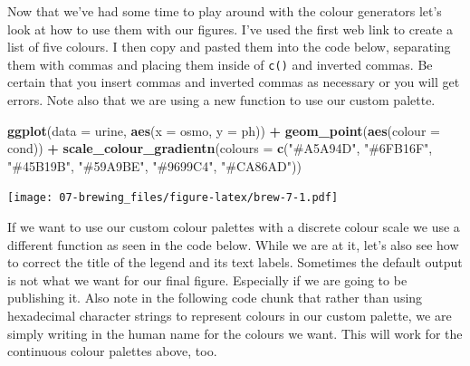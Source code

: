 \documentclass[
]{book}
\newenvironment{Shaded}{\begin{snugshade}}{\end{snugshade}}
\newcommand{\DataTypeTok}[1]{\textcolor[rgb]{0.13,0.29,0.53}{#1}}
\newcommand{\KeywordTok}[1]{\textcolor[rgb]{0.13,0.29,0.53}{\textbf{#1}}}
\newcommand{\NormalTok}[1]{#1}
\newcommand{\OperatorTok}[1]{\textcolor[rgb]{0.81,0.36,0.00}{\textbf{#1}}}
\newcommand{\StringTok}[1]{\textcolor[rgb]{0.31,0.60,0.02}{#1}}
\begin{document}
Now that we've had some time to play around with the colour generators let's look at how to use them with our figures. I've used the first web link to create a list of five colours. I then copy and pasted them into the code below, separating them with commas and placing them inside of \texttt{c()} and inverted commas. Be certain that you insert commas and inverted commas as necessary or you will get errors. Note also that we are using a new function to use our custom palette.

\begin{Shaded}
\begin{Highlighting}[]
\KeywordTok{ggplot}\NormalTok{(}\DataTypeTok{data =}\NormalTok{ urine, }\KeywordTok{aes}\NormalTok{(}\DataTypeTok{x =}\NormalTok{ osmo, }\DataTypeTok{y =}\NormalTok{ ph)) }\OperatorTok{+}
\StringTok{  }\KeywordTok{geom\_point}\NormalTok{(}\KeywordTok{aes}\NormalTok{(}\DataTypeTok{colour =}\NormalTok{ cond)) }\OperatorTok{+}
\StringTok{  }\KeywordTok{scale\_colour\_gradientn}\NormalTok{(}\DataTypeTok{colours =} \KeywordTok{c}\NormalTok{(}\StringTok{"\#A5A94D"}\NormalTok{, }\StringTok{"\#6FB16F"}\NormalTok{, }\StringTok{"\#45B19B"}\NormalTok{,}
                                    \StringTok{"\#59A9BE"}\NormalTok{, }\StringTok{"\#9699C4"}\NormalTok{, }\StringTok{"\#CA86AD"}\NormalTok{))}
\end{Highlighting}
\end{Shaded}

\texttt{[image: 07-brewing\_files/figure-latex/brew-7-1.pdf]}

If we want to use our custom colour palettes with a discrete colour scale we use a different function as seen in the code below. While we are at it, let's also see how to correct the title of the legend and its text labels. Sometimes the default output is not what we want for our final figure. Especially if we are going to be publishing it. Also note in the following code chunk that rather than using hexadecimal character strings to represent colours in our custom palette, we are simply writing in the human name for the colours we want. This will work for the continuous colour palettes above, too.
\end{document}
